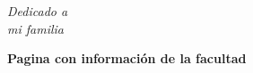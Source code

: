 \documentclass[a4paper,12pt]{article}
\begin{document}
\begin{titlepage}
			\afterpage{\null\newpage}
			\newpage
			
		
			\begin{flushright}
				\textit{Dedicado a \\
					mi familia}
			\end{flushright}
		
			\afterpage{\null\newpage}
			\newpage

		
			\begin{Large}
		
				\textbf{Pagina con información de la facultad} \\
			\end{Large}
			
		
		
			\afterpage{\null\newpage}
			\newpage
			
			

			\afterpage{\null\newpage}
			\newpage
			
			
			
			\afterpage{\null\newpage}
			\newpage
			
			
			
			\afterpage{\null\newpage}
			\newpage		
		
			
			\tableofcontents %
			
			\cleardoublepage
			
		


		
	

	\end{titlepage}
\end{document}
